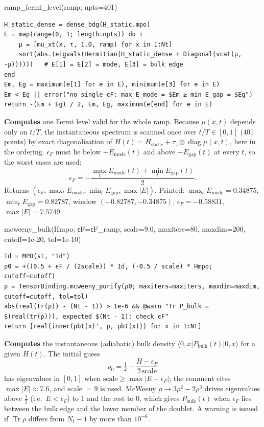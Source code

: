 \documentclass[11pt]{article}
\newcommand{\Tr}{\operatorname{Tr}}
\begin{document}
\begin{function}{ramp\_fermi\_level(ramp; npts=401)}
\begin{Verbatim}
H_static_dense = dense_bdg(H_static.mpo)
E = map(range(0, 1; length=npts)) do τ
    μ = [mu_xt(x, τ, 1.0, ramp) for x in 1:Nt]
    sort(abs.(eigvals(Hermitian(H_static_dense + Diagonal(vcat(μ, -μ))))))   # E[1] = E[2] = mode, E[3] = bulk edge
end
Em, Eg = maximum(e[1] for e in E), minimum(e[3] for e in E)
Em < Eg || error("no single ϵF: max E_mode = $Em ≥ min E_gap = $Eg")
return -(Em + Eg) / 2, Em, Eg, maximum(e[end] for e in E)
\end{Verbatim}
\textbf{Computes} one Fermi level valid for the whole ramp. Because $\mu(x,t)$ depends only on $t/T$, the
instantaneous spectrum is scanned once over $t/T\in[0,1]$ (401 points) by exact diagonalisation of
$H(t)=H_{\text{static}}+\tau_z\otimes\operatorname{diag}\mu(x,t)$, here  in the
 ordering. $\epsilon_F$ must lie below $-E_{\text{mode}}(t)$ and above $-E_{\text{gap}}(t)$ at every
$t$, so the worst cases are used:
\[
  \epsilon_F = -\frac{\max_t E_{\text{mode}}(t) + \min_t E_{\text{gap}}(t)}{2}.
\]
Returns $(\epsilon_F, \max_t E_{\text{mode}}, \min_t E_{\text{gap}}, \max|E|)$. Printed: $\max_tE_{\text{mode}}=0.34875$,
$\min_tE_{\text{gap}}=0.82787$, window $(-0.82787,-0.34875)$, $\epsilon_F=-0.58831$, $\max|E|=7.5749$.
\end{function}

\begin{function}{mcweeny\_bulk(Hmpo; ϵF=ϵF\_ramp, scale=9.0, maxiters=80, maxdim=200, cutoff=1e-20, tol=1e-10)}
\begin{Verbatim}
Id = MPO(st, "Id")
ρ0 = +((0.5 + ϵF / (2scale)) * Id, (-0.5 / scale) * Hmpo; cutoff=cutoff)
ρ = TensorBinding.mcweeny_purify(ρ0; maxiters=maxiters, maxdim=maxdim, cutoff=cutoff, tol=tol)
abs(real(tr(ρ)) - (Nt - 1)) > 1e-6 && @warn "Tr P_bulk = $(real(tr(ρ))), expected $(Nt - 1): check ϵF"
return [real(inner(pbt(x)', ρ, pbt(x))) for x in 1:Nt]
\end{Verbatim}
\textbf{Computes} the instantaneous (adiabatic) bulk density $\langle0,x\vert P_{\text{bulk}}(t)\vert0,x\rangle$ for a
given $H(t)$. The initial guess
\[
  \rho_0 = \tfrac12 - \frac{H-\epsilon_F}{2\,\text{scale}}
\]
has eigenvalues in $[0,1]$ when $\text{scale}\ge\max|E-\epsilon_F|$; the comment cites $\max|E|\approx7.6$, and
scale $=9$ is used. McWeeny $\rho\to3\rho^2-2\rho^3$ drives eigenvalues above $\frac12$ (i.e.\ $E<\epsilon_F$) to 1 and
the rest to 0, which gives $P_{\text{bulk}}(t)$ when $\epsilon_F$ lies between the bulk edge and the lower member of
the doublet. A warning is issued if $\Tr\rho$ differs from $N_t-1$ by more than $10^{-6}$.
\end{function}
\end{document}
